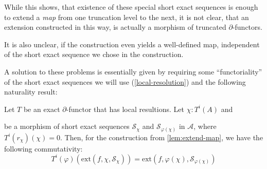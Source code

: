 While this shows, that existence of these special short exact sequences
is enough to extend a \emph{map} from one truncation level to the next,
it is not clear, that an extension constructed in this way,
is actually a morphism of truncated $\partial$-functors.

It is also unclear, if the construction even yields a well-defined map,
independent of the short exact sequence we chose in the construction.

A solution to these problems is essentially given by
requiring some ``functoriality'' of the short exact sequences we will use (\cref{local-resolution}) and
the following naturality result:

\begin{lemma}
  \label{lem:extension-welldefined}
  Let $T$ be an exact $\partial$-functor that has local resultions.
  Let $\chi:T^i(A)$ and
  \begin{center}
  \end{center}
  be a morphism of short exact sequences ${\mathcal S}_\chi$ and $\mathcal{S}_{\varphi(\chi)}$ in $\mathcal A$,
  where $T^i(r_\chi)(\chi)=0$.
  Then, for the construction from \cref{lem:extend-map}, we have the following commutativity:
  \[ T^i(\varphi)(\mathrm{ext}(f,\chi,{\mathcal S}_\chi)) = \mathrm{ext}(f,\varphi(\chi),\mathcal{S}_{\varphi(\chi)}) \]
\end{lemma}

